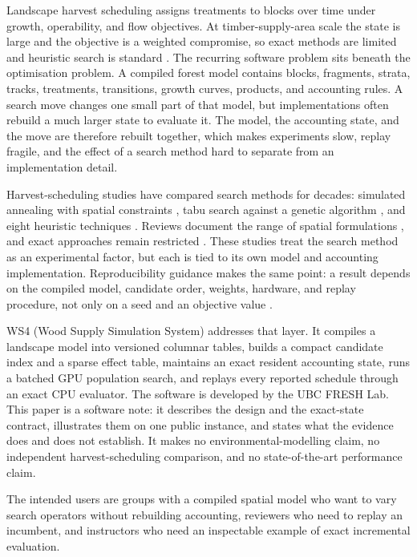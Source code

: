 \documentclass[a4paper,fleqn]{cas-sc}
\begin{document}
Landscape harvest scheduling assigns treatments to blocks over time under growth, operability, and
flow objectives. At timber-supply-area scale the state is large and the objective is a weighted
compromise, so exact methods are limited and heuristic search is standard
\citep{johnson1977,davis2001}. The recurring software problem sits beneath the optimisation problem. A
compiled forest model contains blocks, fragments, strata, tracks, treatments, transitions, growth
curves, products, and accounting rules. A search move changes one small part of that model, but
implementations often rebuild a much larger state to evaluate it. The model, the accounting state, and
the move are therefore rebuilt together, which makes experiments slow, replay fragile, and the effect
of a search method hard to separate from an implementation detail.

Harvest-scheduling studies have compared search methods for decades: simulated annealing with spatial
constraints \citep{lockwood1993}, tabu search against a genetic algorithm \citep{boston2002}, and eight
heuristic techniques \citep{bettinger2002}. Reviews document the range of spatial formulations
\citep{murray1999,baskent2005}, and exact approaches remain restricted \citep{goycoolea2005}. These
studies treat the search method as an experimental factor, but each is tied to its own model and
accounting implementation. Reproducibility guidance makes the same point: a result depends on the
compiled model, candidate order, weights, hardware, and replay procedure, not only on a seed and an
objective value \citep{peng2011,sandve2013,wilson2014,stodden2016}.

WS4 (Wood Supply Simulation System) addresses that layer. It compiles a landscape model into versioned
columnar tables, builds a compact candidate index and a sparse effect table, maintains an exact resident
accounting state, runs a batched GPU population search, and replays every reported schedule through an
exact CPU evaluator. The
software is developed by the UBC FRESH Lab. This paper is a software note: it describes the design and
the exact-state contract, illustrates them on one public instance, and states what the evidence does
and does not establish. It makes no environmental-modelling claim, no independent harvest-scheduling
comparison, and no state-of-the-art performance claim.

The intended users are groups with a compiled spatial model who want to vary search operators without
rebuilding accounting, reviewers who need to replay an incumbent, and instructors who need an
inspectable example of exact incremental evaluation.
\end{document}
